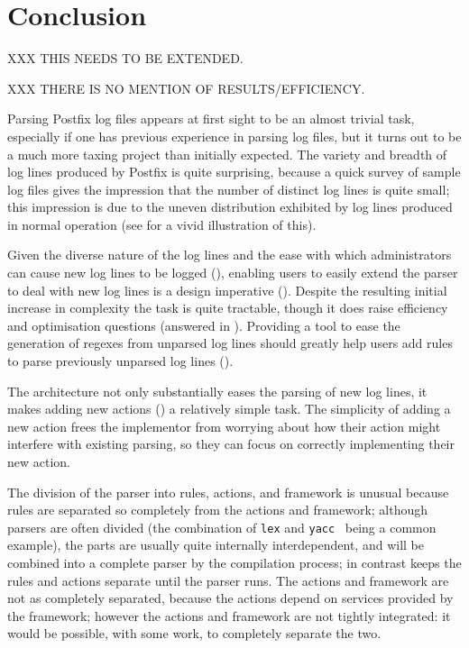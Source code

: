 \chapter{Conclusion}

\label{conclusion}

XXX THIS NEEDS TO BE EXTENDED\@.

XXX THERE IS NO MENTION OF RESULTS/EFFICIENCY\@.

Parsing Postfix log files appears at first sight to be an almost trivial
task, especially if one has previous experience in parsing log files, but
it turns out to be a much more taxing project than initially expected.  The
variety and breadth of log lines produced by Postfix is quite surprising,
because a quick survey of sample log files gives the impression that the
number of distinct log lines is quite small; this impression is due to the
uneven distribution exhibited by log lines produced in normal operation
(see  for a vivid illustration of this).


Given the diverse nature of the log lines and the ease with which
administrators can cause new log lines to be logged (), enabling users to easily extend the parser to deal with new
log lines is a design imperative ().  Despite the
resulting initial increase in complexity the task is quite tractable,
though it does raise efficiency and optimisation questions (answered in
).  Providing a tool to ease the generation
of regexes from unparsed log lines should greatly help users add rules
to parse previously unparsed log lines ().


The architecture not only substantially eases the parsing of new log
lines, it makes adding new actions () a
relatively simple task.  The simplicity of adding a new action frees the
implementor from worrying about how their action might interfere with
existing parsing, so they can focus on correctly implementing their new
action.


The division of the parser into rules, actions, and framework is unusual
because rules are separated so completely from the actions and framework;
although parsers are often divided (the combination of \texttt{lex} and
\texttt{yacc}~\cite{lex-and-yacc-book} being a common example), the parts
are usually quite internally interdependent, and will be combined into a
complete parser by the compilation process; in contrast \parsername{} keeps
the rules and actions separate until the parser runs.  The actions and
framework are not as completely separated, because the actions depend on
services provided by the framework; however the actions and framework are
not tightly integrated: it would be possible, with some work, to completely
separate the two.

